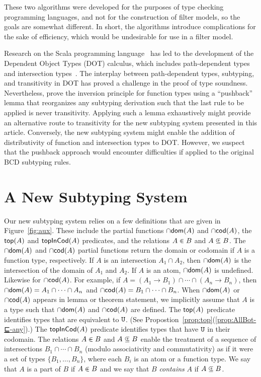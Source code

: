 \documentclass{article}
\begin{document}
These two algorithms were developed for the purposes of type checking
programming languages, and not for the construction of filter models,
so the goals are somewhat different. In short, the algorithms
introduce complications for the sake of efficiency, which would be
undesirable for use in a filter model.

Research on the Scala programming language~\citep{Odersky:2004aa} has
led to the development of the Dependent Object Types (DOT) calculus,
which includes path-dependent types and intersection
types~\citep{Amin:2016aa,Amin:2017aa}.  The interplay between
path-dependent types, subtyping, and transitivity in DOT has proved a
challenge in the proof of type soundness. Nevertheless,
\citet{Rompf:2016aa} prove the inversion principle for function types
using a ``pushback'' lemma that reorganizes any subtyping derivation
such that the last rule to be applied is never transitivity. Applying
such a lemma exhaustively might provide an alternative route to
transitivity for the new subtyping system presented in this
article. Conversely, the new subtyping system might enable the
addition of distributivity of function and intersection types to
DOT. However, we suspect that the pushback approach would encounter
difficulties if applied to the original BCD subtyping rules.


\section{A New Subtyping System}
\label{sec:new-subtyping}

Our new subtyping system relies on a few definitions that are given in
Figure~\ref{fig:aux}. These include the partial functions $\cap\mathsf{dom}(A)$
and $\cap\mathsf{cod}(A)$, the $\mathsf{top}(A)$ and $\mathsf{topInCod}(A)$ predicates, and the
relations $A \inplus B$ and $A \subsetpluseq B$.
%
The $\cap\mathsf{dom}(A)$ and $\cap\mathsf{cod}(A)$ partial functions return the domain or
codomain if $A$ is a function type, respectively. If $A$ is an
intersection $A_1 \cap A_2$, then $\cap\mathsf{dom}(A)$ is the intersection of the
domain of $A_1$ and $A_2$.  If $A$ is an atom, $\cap\mathsf{dom}(A)$ is
undefined. Likewise for $\cap\mathsf{cod}(A)$. For example, if $A = (A_1 \to B_1)
\cap \cdots \cap (A_n \to B_n)$, then $\cap\mathsf{dom}(A) = A_1 \cap \cdots \cap
A_n$ and $\cap\mathsf{cod}(A) = B_1 \cap \cdots \cap B_n$.  When $\cap\mathsf{dom}(A)$ or
$\cap\mathsf{cod}(A)$ appears in lemma or theorem statement, we implicitly assume
that $A$ is a type such that $\cap\mathsf{dom}(A)$ and $\cap\mathsf{cod}(A)$ are defined.
%
The $\mathsf{top}(A)$ predicate identifies types that are equivalent to
$\mathtt{U}$. (See Propostion~\ref{prop:top}(\ref{prop:AllBot-⊑-any}).) The
$\mathsf{topInCod}(A)$ predicate identifies types that have $\mathtt{U}$ in their
codomain.
%
The relations $A \inplus B$ and $A \subsetpluseq B$ enable the
treatment of a sequence of intersections $B_1 \cap \cdots \cap B_n$
(modulo associativity and commutativity) as if it were a set of types
$\{ B_1, \ldots, B_n \}$, where each $B_i$ is an atom or a function
type.  We say that $A$ is a part of $B$ if $A \inplus B$ and we say
that $B$ \emph{contains} $A$ if $A \subsetpluseq B$.
\end{document}
